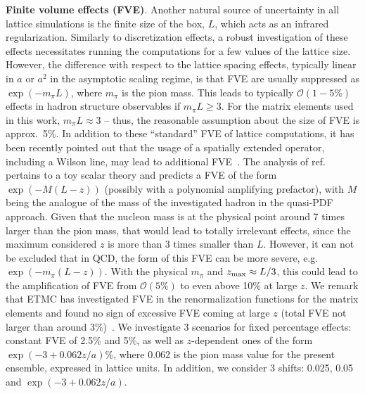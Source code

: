 \textbf{Finite volume effects (FVE)}. Another natural source of uncertainty in
all lattice simulations is the finite size of the box, $L$, which acts as an
infrared regularization. Similarly to discretization effects, a robust
investigation of these effects necessitates running the computations for a few
values of the lattice size. However, the difference with respect to the lattice
spacing effects, typically linear in $a$ or $a^2$ in the asymptotic scaling
regime, is that FVE are usually suppressed as $\exp(-m_\pi L)$, where $m_\pi$ is
the pion mass. This leads to typically $\mathcal{O}(1-5\%)$ effects in hadron
structure observables if $m_\pi L\geq 3$. For the matrix elements used in this
work, $m_\pi L\approx3$ -- thus, the reasonable assumption about the size of FVE
is approx.\ 5\%. In addition to these ``standard'' FVE of lattice computations,
it has been recently pointed out that the usage of a spatially extended
operator, including a Wilson line, may lead to additional
FVE~\cite{Briceno:2018lfj}. The analysis of ref.~\cite{Briceno:2018lfj}
pertains to a toy scalar theory and predicts a FVE of the form $\exp(-M (L-z))$
(possibly with a polynomial amplifying prefactor), with $M$ being the analogue
of the mass of the investigated hadron in the quasi-PDF approach. Given that the
nucleon mass is at the physical point around 7 times larger than the pion mass,
that would lead to totally irrelevant effects, since the maximum considered $z$
is more than 3 times smaller than $L$. However, it can not be excluded that in
QCD, the form of this FVE can be more severe, e.g.\ $\exp(-m_\pi (L-z))$. With
the physical $m_\pi$ and $z_{\rm max}\approx L/3$, this could lead to the
amplification of FVE from $\mathcal{O}(5\%)$ to even above 10\% at large $z$. We
remark that ETMC has investigated FVE in the renormalization functions for the
matrix elements and found no sign of excessive FVE coming at large $z$ (total
FVE not larger than around 3\%)~\cite{Alexandrou:2019lfo}. We investigate 3
scenarios for fixed percentage effects: constant FVE of 2.5\% and 5\%, as well
as $z$-dependent ones of the form $\exp(-3+0.062z/a)\%$, where 0.062 is the pion
mass value for the present ensemble, expressed in lattice units. In addition, we
consider 3 shifts: 0.025, 0.05 and $\exp(-3+0.062z/a)$.

